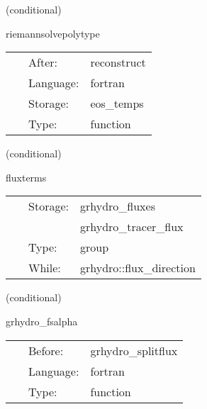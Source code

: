 \vspace{5mm}

   (conditional) 

\hspace{5mm} riemannsolvepolytype 

\hspace{5mm}{\it solve the local riemann problems } 


\hspace{5mm}

 \begin{tabular*}{160mm}{cll} 
~ & After:  & reconstruct \\ 
~ & Language:  & fortran \\ 
~ & Storage:  & eos\_temps \\ 
~ & Type:  & function \\ 
\end{tabular*} 


\vspace{5mm}

   (conditional) 

\hspace{5mm} fluxterms 

\hspace{5mm}{\it calculation of intercell fluxes } 


\hspace{5mm}

 \begin{tabular*}{160mm}{cll} 
~ & Storage:  & grhydro\_fluxes \\ 
~& ~ &grhydro\_tracer\_flux\\ 
~ & Type:  & group \\ 
~ & While:  & grhydro::flux\_direction \\ 
\end{tabular*} 


\vspace{5mm}

   (conditional) 

\hspace{5mm} grhydro\_fsalpha 

\hspace{5mm}{\it compute the maximum characteristic speeds } 


\hspace{5mm}

 \begin{tabular*}{160mm}{cll} 
~ & Before:  & grhydro\_splitflux \\ 
~ & Language:  & fortran \\ 
~ & Type:  & function \\ 
\end{tabular*} 


